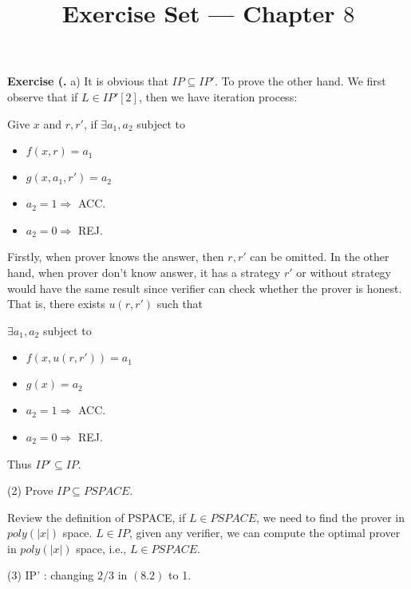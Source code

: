 \documentclass[a4paper]{article}
\title{Exercise Set --- Chapter $8$}
\date{}
\newenvironment{exercise}[1]{
	\par
	\noindent\textbf{Exercise #1.}\quad
}{
	\par
	\bigskip
}
\begin{document}
\maketitle

\begin{exercise}{8.1}
(a) It is obvious that $IP\subseteq IP'$. To prove the other hand. We first observe that if $L \in IP'[2]$, then we have iteration process:

Give $x$ and $r,r'$, if $\exists a_{1}, a_{2}$ subject to
\begin{itemize}
\item $f(x, r) = a_{1}$
\item $g(x, a_{1}, r') = a_{2}$
\item $a_{2} = 1\Rightarrow $ ACC.
\item $a_{2} = 0 \Rightarrow $ REJ.
\end{itemize}

Firstly, when prover knows the answer, then $r, r'$ can be omitted. In the other hand, when prover don't know answer, it has a strategy $r'$ or without strategy would have the same result since verifier can check whether the prover is honest. That is, there exists $u(r, r')$ such that

$\exists a_{1}, a_{2}$ subject to
\begin{itemize}
\item $f(x, u(r,r')) = a_{1}$
\item $g(x) = a_{2}$
\item $a_{2} = 1\Rightarrow $ ACC.
\item $a_{2} = 0 \Rightarrow $ REJ.
\end{itemize}
  Thus $IP'\subseteq IP$.

(2) Prove $IP\subseteq PSPACE$.

Review the definition of PSPACE, if $L\in PSPACE$, we need to find the prover in $poly(|x|)$ space. $L\in IP$, given any verifier, we can compute the optimal prover in $poly(|x|)$ space, i.e., $L\in PSPACE$.

(3) IP' : changing $2/3$ in $(8.2)$ to 1.


\end{exercise}
\end{document}
